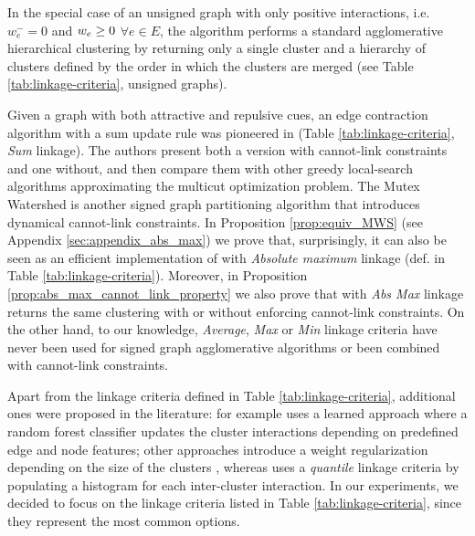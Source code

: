 In the special case of an unsigned graph with only positive interactions, i.e. $w_e^-=0$ and $w_e \geq 0$ $\forall e\in E$, 
 the algorithm performs a standard agglomerative hierarchical clustering by returning only a single cluster and a hierarchy of clusters defined by the order in which the clusters are merged (see Table \ref{tab:linkage-criteria}, unsigned graphs).

Given a graph with both attractive and repulsive cues, an edge contraction algorithm with a sum update rule was pioneered in \cite{levinkov2017comparative,keuper2015efficient} (Table \ref{tab:linkage-criteria}, \emph{Sum} linkage). The authors present both a version with cannot-link constraints and one without, and then compare them with other greedy local-search algorithms approximating the multicut optimization problem.
The Mutex Watershed \cite{wolf2018mutex} is another signed graph partitioning algorithm that introduces dynamical cannot-link constraints. In Proposition \ref{prop:equiv_MWS} (see Appendix \ref{sec:appendix_abs_max}) we prove that, surprisingly, it can also be seen as an efficient implementation of \algname{} with \emph{Absolute maximum} linkage (def. in Table \ref{tab:linkage-criteria}). Moreover, in Proposition \ref{prop:abs_max_cannot_link_property} we also prove that \algname{} with \emph{Abs Max} linkage returns the same clustering with or without enforcing cannot-link constraints.
On the other hand, to our knowledge, \emph{Average}, \emph{Max} or \emph{Min} linkage criteria have never been used for signed graph agglomerative algorithms or been combined with cannot-link constraints.

Apart from the linkage criteria defined in Table \ref{tab:linkage-criteria}, additional ones were proposed in the literature:
\cite{nunez2013machine} for example uses a learned approach where a random forest classifier updates the cluster interactions depending on predefined edge and node features; other approaches introduce a weight regularization depending on the size of the clusters \cite{felzenszwalb2004efficient,kardoostsolving}, whereas 
\cite{funke2018large} uses a \emph{quantile} linkage criteria by populating a histogram for each inter-cluster interaction. In our experiments, we decided to focus on the linkage criteria listed in Table \ref{tab:linkage-criteria}, since they represent the most common options.

